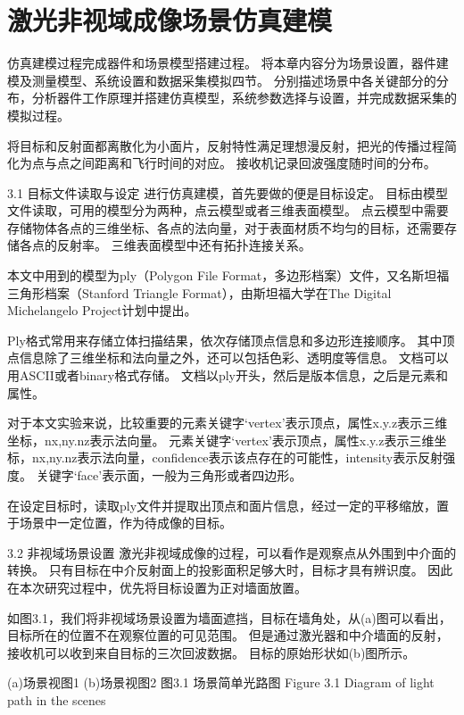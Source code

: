 \chapter{激光非视域成像场景仿真建模}\label{chap:Simulation}

仿真建模过程完成器件和场景模型搭建过程。
将本章内容分为场景设置，器件建模及测量模型、系统设置和数据采集模拟四节。
分别描述场景中各关键部分的分布，分析器件工作原理并搭建仿真模型，系统参数选择与设置，并完成数据采集的模拟过程。

将目标和反射面都离散化为小面片，反射特性满足理想漫反射，把光的传播过程简化为点与点之间距离和飞行时间的对应。
接收机记录回波强度随时间的分布。

3.1  目标文件读取与设定
进行仿真建模，首先要做的便是目标设定。
目标由模型文件读取，可用的模型分为两种，点云模型或者三维表面模型。
点云模型中需要存储物体各点的三维坐标、各点的法向量，对于表面材质不均匀的目标，还需要存储各点的反射率。
三维表面模型中还有拓扑连接关系。

本文中用到的模型为ply（Polygon File Format，多边形档案）文件，又名斯坦福三角形档案（Stanford Triangle Format），由斯坦福大学在The Digital Michelangelo Project计划中提出。

Ply格式常用来存储立体扫描结果，依次存储顶点信息和多边形连接顺序。
其中顶点信息除了三维坐标和法向量之外，还可以包括色彩、透明度等信息。
文档可以用ASCII或者binary格式存储。
文档以ply开头，然后是版本信息，之后是元素和属性。

对于本文实验来说，比较重要的元素关键字‘vertex’表示顶点，属性x.y.z表示三维坐标，nx,ny.nz表示法向量。
元素关键字‘vertex’表示顶点，属性x.y.z表示三维坐标，nx,ny.nz表示法向量，confidence表示该点存在的可能性，intensity表示反射强度。
关键字‘face’表示面，一般为三角形或者四边形。

在设定目标时，读取ply文件并提取出顶点和面片信息，经过一定的平移缩放，置于场景中一定位置，作为待成像的目标。


3.2  非视域场景设置
激光非视域成像的过程，可以看作是观察点从外围到中介面的转换。
只有目标在中介反射面上的投影面积足够大时，目标才具有辨识度。
因此在本次研究过程中，优先将目标设置为正对墙面放置。

如图3.1，我们将非视域场景设置为墙面遮挡，目标在墙角处，从(a)图可以看出，目标所在的位置不在观察位置的可见范围。
但是通过激光器和中介墙面的反射，接收机可以收到来自目标的三次回波数据。
目标的原始形状如(b)图所示。


   
(a)场景视图1                       (b)场景视图2
图3.1  场景简单光路图
Figure 3.1 Diagram of light path in the scenes

